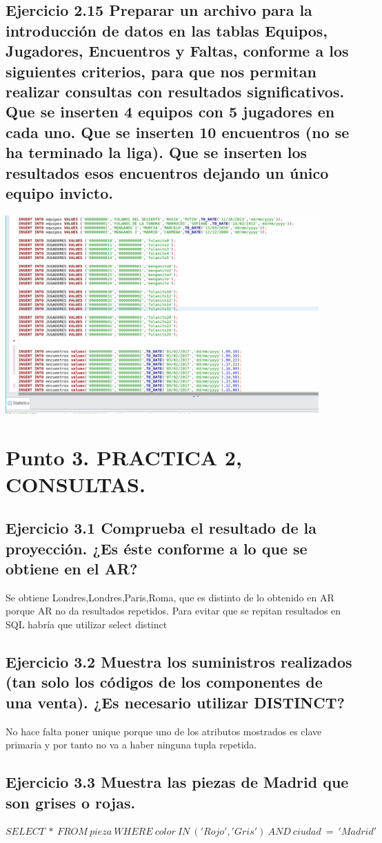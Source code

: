 \documentclass[a4paper, 11pt]{article}
\begin{document}
\subsection{Ejercicio 2.15 Preparar un archivo para la introducción de datos en las tablas Equipos,
	Jugadores, Encuentros y Faltas, conforme a los siguientes criterios, para que nos permitan
	realizar consultas con resultados significativos.
	Que se inserten 4 equipos con 5 jugadores en cada uno.
	Que se inserten 10 encuentros (no se ha terminado la liga).
	Que se inserten los resultados esos encuentros dejando un único equipo invicto.}
\includegraphics[width=0.9\textwidth]{2.png}

\section{Punto 3.  PRACTICA 2, CONSULTAS.}
\subsection{Ejercicio 3.1 Comprueba el resultado de la proyección. ¿Es éste conforme a lo que se obtiene
	en el AR?}
Se obtiene Londres,Londres,Paris,Roma, que es distinto de lo obtenido en AR porque AR no da resultados repetidos. Para evitar que se repitan resultados en SQL habría que utilizar select distinct 
\subsection{Ejercicio 3.2 Muestra los suministros realizados (tan solo los códigos de los componentes
	de una venta). ¿Es necesario utilizar DISTINCT?}
No hace falta poner unique porque uno de los atributos mostrados es clave primaria y por tanto no va a haber ninguna tupla repetida.

\subsection{Ejercicio 3.3 Muestra las piezas de Madrid que son grises o rojas.}
$SELECT\ *\ FROM\ pieza\ WHERE\ color\ IN\ ('Rojo','Gris')\ AND\ ciudad\ =\ 'Madrid'$
\end{document}
